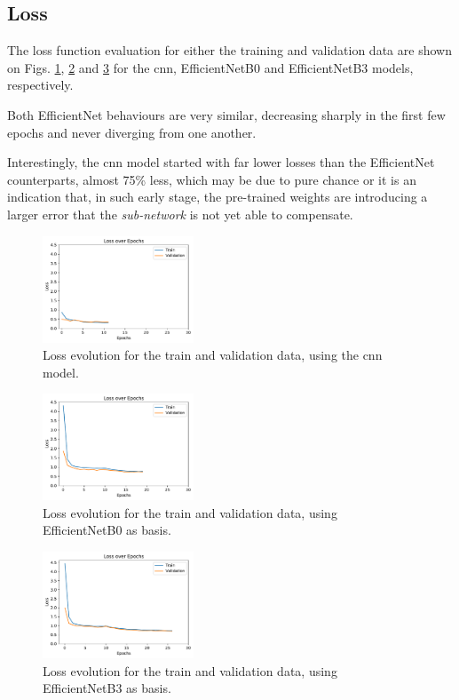 \documentclass[conference]{IEEEtran}
\begin{document}
\subsection{Loss}

The loss function evaluation for either the training and validation data are shown on Figs. \ref{fig:cnn_loss}, \ref{fig:b0_loss} and \ref{fig:b3_loss} for the \gls{cnn}, EfficientNetB0 and EfficientNetB3 models, respectively.

Both EfficientNet behaviours are very similar, decreasing sharply in the first few epochs and never diverging from one another. 

Interestingly, the \gls{cnn} model started with far lower losses than the EfficientNet counterparts, almost 75\% less, which may be due to pure chance or it is an indication that, in such early stage, the pre-trained weights are introducing a larger error that the \textit{sub-network} is not yet able to compensate.

\begin{figure}[htp]
    \centering
    \includegraphics[width=0.4\textwidth]{imgs/cnn_loss.pdf}
    \caption{Loss evolution for the train and validation data, using the \gls{cnn} model.}
    \label{fig:cnn_loss}
\end{figure}

\begin{figure}[htp]
    \centering
    \includegraphics[width=0.4\textwidth]{imgs/EfficientNetB0_loss.pdf}
    \caption{Loss evolution for the train and validation data, using EfficientNetB0 as basis.}
    \label{fig:b0_loss}
\end{figure}

\begin{figure}[htp]
    \centering
    \includegraphics[width=0.4\textwidth]{imgs/EfficientNetB3_loss.pdf}
    \caption{Loss evolution for the train and validation data, using EfficientNetB3 as basis.}
    \label{fig:b3_loss}
\end{figure}
\end{document}
